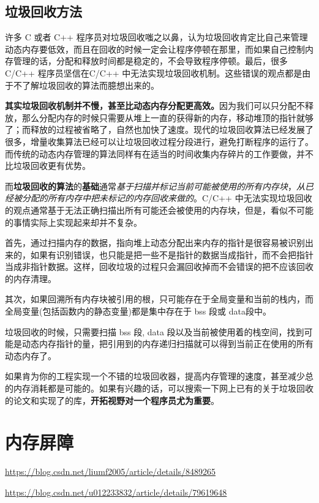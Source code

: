 \documentclass[UTF8,a4paper,12pt]{ctexbook}
\begin{document}
			
			
		\subsection{垃圾回收方法}
			许多 C 或者 C++ 程序员对垃圾回收嗤之以鼻，认为垃圾回收肯定比自己来管理动态内存要低效，而且在回收的时候一定会让程序停顿在那里，而如果自己控制内存管理的话，分配和释放时间都是稳定的，不会导致程序停顿。最后，很多 C/C++ 程序员坚信在C/C++ 中无法实现垃圾回收机制。这些错误的观点都是由于不了解垃圾回收的算法而臆想出来的。
			
			\textbf{其实垃圾回收机制并不慢，甚至比动态内存分配更高效。}因为我们可以只分配不释放，那么分配内存的时候只需要从堆上一直的获得新的内存，移动堆顶的指针就够了；而释放的过程被省略了，自然也加快了速度。现代的垃圾回收算法已经发展了很多，增量收集算法已经可以让垃圾回收过程分段进行，避免打断程序的运行了。而传统的动态内存管理的算法同样有在适当的时间收集内存碎片的工作要做，并不比垃圾回收更有优势。
			
			而\textbf{垃圾回收的算法}的\textbf{基础}通常\textit{基于扫描并标记当前可能被使用的所有内存块}，\textit{从已经被分配的所有内存中把未标记的内存回收来做的}。C/C++ 中无法实现垃圾回收的观点通常基于无法正确扫描出所有可能还会被使用的内存块，但是，看似不可能的事情实际上实现起来却并不复杂。
			
			首先，通过扫描内存的数据，指向堆上动态分配出来内存的指针是很容易被识别出来的，如果有识别错误，也只能是把一些不是指针的数据当成指针，而不会把指针当成非指针数据。这样，回收垃圾的过程只会漏回收掉而不会错误的把不应该回收的内存清理。
			
			其次，如果回溯所有内存块被引用的根，只可能存在于全局变量和当前的栈内，而全局变量(包括函数内的静态变量)都是集中存在于 bss 段或 data段中。
			
			垃圾回收的时候，只需要扫描 bss 段, data 段以及当前被使用着的栈空间，找到可能是动态内存指针的量，把引用到的内存递归扫描就可以得到当前正在使用的所有动态内存了。
			
			如果肯为你的工程实现一个不错的垃圾回收器，提高内存管理的速度，甚至减少总的内存消耗都是可能的。如果有兴趣的话，可以搜索一下网上已有的关于垃圾回收的论文和实现了的库，\textbf{开拓视野对一个程序员尤为重要}。
	
	
	\section{内存屏障}
		\url{https://blog.csdn.net/liumf2005/article/details/8489265}
		
		\url{https://blog.csdn.net/u012233832/article/details/79619648}
		
\end{document}
